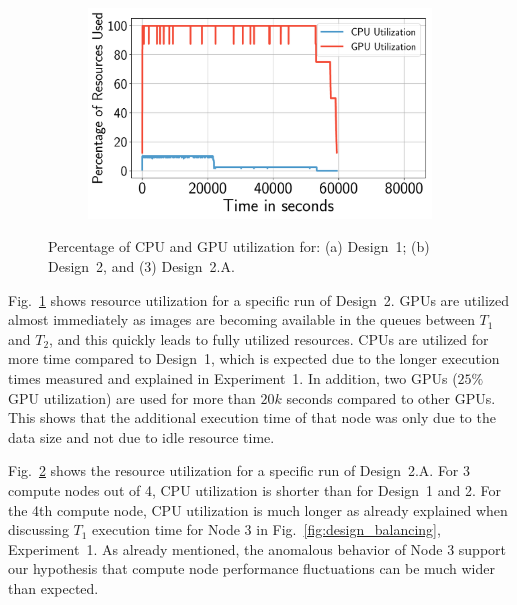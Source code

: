 \begin{figure}[H]
\begin{subfigure}[b]{0.75\textwidth}
        \caption{}
        \label{fig:design2util}
    \end{subfigure}\\
    ~ 
    \begin{subfigure}[b]{0.75\textwidth}
        \includegraphics[width=\textwidth]{figures/designs/Design2AUtilization.pdf}
        \caption{}
        \label{fig:design2autil}
    \end{subfigure}
    \caption{Percentage of CPU and GPU utilization for: (a) Design~1; (b)
        Design~2, and (3) Design~2.A.}
    \label{fig:Utilization}
\end{figure}


Fig.~\ref{fig:design2util} shows resource utilization for a specific run of Design~2.
GPUs are utilized almost immediately as images are becoming available in the queues between $T_{1}$ and $T_{2}$, and this quickly leads to fully utilized resources.
CPUs are utilized for more time compared to Design~1, which is expected due to the longer execution times measured and explained in Experiment~1.
In addition, two GPUs ($25\%$ GPU utilization) are used for more than $20k$ seconds compared to other GPUs.
This shows that the additional execution time of that node was only due to the data size and not due to idle resource time.

Fig.~\ref{fig:design2autil} shows the resource utilization for a specific run of Design~2.A.
For 3 compute nodes out of 4, CPU utilization is shorter than for Design~1 and 2.
For the 4th compute node, CPU utilization is much longer as already explained when discussing $T_{1}$ execution time for Node 3 in Fig.~\ref{fig:design_balancing}, Experiment~1.
As already mentioned, the anomalous behavior of Node 3 support our hypothesis that compute node performance fluctuations can be much wider than expected.

